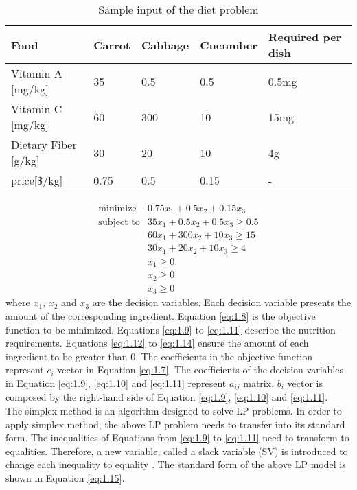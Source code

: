\begin{table} 
\begin{center}
\begin{tabular}{| l | l  l  l | l |}
\hline
Food & Carrot & Cabbage & Cucumber & Required per dish \\ \hline
Vitamin A [mg/kg] & 35 & 0.5 & 0.5 & 0.5mg \\ 
Vitamin C [mg/kg] & 60 & 300 & 10 & 15mg \\ 
Dietary Fiber [g/kg] & 30 & 20 & 10 & 4g \\ \hline
price[$\$$/kg] & 0.75 & 0.5 & 0.15 & - \\ \hline
\end{tabular} 
\end{center}
\caption{Sample input of the diet problem}
\label{tab:1.1}
\end{table}	

\begin{eqnarray} 
\text{minimize} & 0.75x_{1} + 0.5x_{2} +  0.15x_{3}  \label{eq:1.8} \\
\text{subject to} & 35x_{1} + 0.5x_{2} + 0.5x_{3} \geq 0.5 \label{eq:1.9} \\
& 60x_{1} + 300x_{2} + 10x_{3} \geq 15 \label{eq:1.10} \\
& 30x_{1} + 20x_{2} + 10x_{3} \geq 4 \label{eq:1.11} \\
& x_{1} \geq 0  \label{eq:1.12} \\
& x_{2} \geq 0  \label{eq:1.13} \\
& x_{3} \geq 0  \label{eq:1.14}
\end{eqnarray} 
where $x_{1}$, $x_{2}$ and $x_{3}$ are the decision variables. Each decision variable presents the amount of the corresponding ingredient. Equation \ref{eq:1.8} is the objective function to be minimized. Equations \ref{eq:1.9} to  \ref{eq:1.11} describe the nutrition requirements. Equations \ref{eq:1.12} to \ref{eq:1.14} ensure the amount of each ingredient to be greater than 0. The coefficients in the objective function represent $c_{i}$ vector in Equation \ref{eq:1.7}. The coefficients of the decision variables in Equation \ref{eq:1.9}, \ref{eq:1.10} and \ref{eq:1.11} represent $a_{ij}$ matrix. $b_{i}$ vector is composed by the right-hand side of Equation \ref{eq:1.9}, \ref{eq:1.10} and \ref{eq:1.11}. \\

The simplex method is an algorithm designed to solve LP problems. In order to apply simplex method, the above LP problem needs to transfer into its standard form. The inequalities of Equations from \ref{eq:1.9} to \ref{eq:1.11} need to transform to equalities. Therefore, a new variable, called a slack variable (SV) is introduced to change each inequality to equality \cite{ConvexOptimization}. The standard form of the above LP model is shown in Equation \ref{eq:1.15}. 

